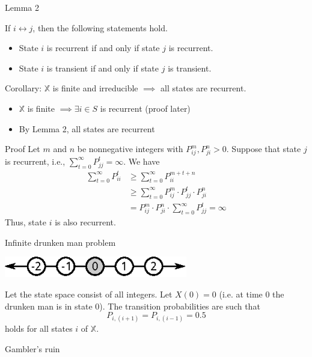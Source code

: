 \documentclass[mathserif]{beamer}
\begin{document}
\begin{frame}{Lemma 2}
	\begin{lemma}
	If $i \leftrightarrow j$, then the following statements hold.
	\begin{itemize}
	\item State $i$ is recurrent if and only if state $j$ is recurrent.
	\item State $i$ is transient if and only if state $j$ is transient.
	\end{itemize}
	Corollary: $\mathbb{X}$ is finite and irreducible $\implies$ all states are recurrent.
	\begin{itemize}
	\item $\mathbb{X}$ is finite $\implies \exists i \in S$ is recurrent (proof later)
	\item By Lemma 2, all states are recurrent
	\end{itemize}
	\end{lemma}
\end{frame}

\begin{frame}{Proof}
	Let $m$ and $n$ be nonnegative integers with $P^m_{ij},  P^n_{ji} > 0$.
	Suppose that state $j$ is recurrent, i.e., $\sum_{t=0}^\infty P^t_{jj} = \infty$.
	We have
	\begin{align*}
	\sum_{t=0}^\infty P^t_{ii} & \geq \sum_{t=0}^\infty P^{m+t+n}_{ii} \\
	& \geq \sum_{t=0}^\infty P^m_{ij} \cdot P^t_{jj} \cdot P^n_{ji} \\
	& = P^m_{ij} \cdot P^n_{ji} \cdot \sum_{t=0}^\infty P^t_{jj} = \infty
	\end{align*}
	Thus, state $i$ is also recurrent.
\end{frame}

\begin{frame}{Infinite drunken man problem}
	\begin{center}
	\includegraphics[width=0.6\textwidth]{infinite_drunken.eps}
	\end{center}
	Let the state space consist of all integers.
	Let $X(0) = 0$ (i.e. at time 0 the drunken man is in state 0).
	The transition probabilities are such that
	\[
	P_{i, (i+1)} = P_{i, (i-1)} = 0.5
	\]
	holds for all states $i$ of $\mathbb{X}$.
\end{frame}

\begin{frame}{Gambler's ruin}
\end{frame}
\end{document}
